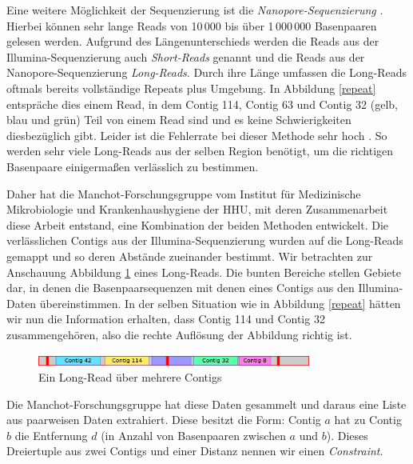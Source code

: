 Eine weitere Möglichkeit der Sequenzierung ist die 
\emph{Nanopore-Sequenzierung} \cite{Nanopore}. Hierbei können sehr lange Reads von 10\,000 bis über 1\,000\,000 Basenpaaren gelesen werden. Aufgrund des Längenunterschieds werden die Reads aus der 
Illumina-Sequenzierung auch \emph{Short-Reads} genannt 
und die Reads aus der Nanopore-Sequenzierung \emph{Long-Reads}. Durch ihre Länge umfassen die Long-Reads oftmals bereits vollständige Repeats plus Umgebung. In 
Abbildung \ref{repeat} entspräche dies einem Read, in dem Contig 114, Contig 63 und Contig 32 (gelb, blau und grün) Teil von einem Read sind und es keine Schwierigkeiten diesbezüglich gibt. Leider ist die Fehlerrate bei dieser Methode sehr hoch \cite{Harris475194}. 
So werden sehr viele Long-Reads aus der selben Region benötigt, um die richtigen Basenpaare einigermaßen verlässlich zu bestimmen.


Daher hat die Manchot-Forschungsgruppe vom Institut für Medizinische Mikrobiologie und Krankenhaushygiene der HHU, mit deren Zusammenarbeit diese Arbeit entstand, eine Kombination der beiden Methoden entwickelt.
Die verlässlichen Contigs aus der 
Illumina-Sequenzierung wurden auf die Long-Reads gemappt und so deren Abstände zueinander bestimmt. 
Wir betrachten zur Anschauung Abbildung \ref{longread} eines Long-Reads. Die bunten Bereiche stellen Gebiete dar, in denen die Basenpaarsequenzen mit denen eines Contigs aus den 
Illumina-Daten übereinstimmen. In der selben Situation wie in Abbildung \ref{repeat} hätten wir nun die Information erhalten, dass Contig 114 und Contig 32 zusammengehören, also die rechte Auflösung der Abbildung richtig ist. 
\begin{figure}[b!]
\begin{center}
\includegraphics[width=0.8\textwidth]{bilder/longread}
\end{center}
\caption{Ein Long-Read über mehrere Contigs}
\label{longread}
\end{figure}

Die Manchot-Forschungsgruppe hat diese Daten gesammelt und daraus eine Liste aus paarweisen Daten extrahiert. Diese besitzt die Form: Contig $a$ hat zu Contig $b$ die Entfernung $d$ (in Anzahl von Basenpaaren zwischen $a$ und $b$). Dieses Dreiertuple aus zwei Contigs und einer Distanz nennen wir einen \emph{Constraint}.


